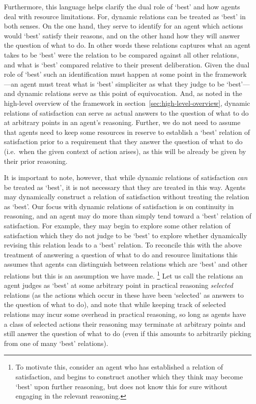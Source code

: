 \documentclass[10pt]{article}
\begin{document}
Furthermore, this language helps clarify the dual role of `best' and how agents deal with resource limitations.
For, dynamic relations can be treated as `best' in both senses.
On the one hand, they serve to identify for an agent which actions would `best' satisfy their reasons, and on the other hand how they will answer the question of what to do.
In other words these relations captures what an agent takes to be `best' were the relation to be compared against all other relations, and what is `best' compared relative to their present deliberation.
Given the dual role of `best' such an identification must happen at some point in the framework---an agent must treat what is `best' simpliciter as what they judge to be `best'---and dynamic relations serve as this point of equivocation.
And, as noted in the high-level overview of the framework in section~\ref{sec:high-level-overview}, dynamic relations of satisfaction can serve as actual answers to the question of what to do at arbitrary points in an agent's reasoning.
Further, we do not need to assume that agents need to keep some resources in reserve to establish a `best' relation of satisfaction prior to a requirement that they answer the question of what to do (i.e.\ when the given context of action arises), as this will be already be given by their prior reasoning.

It is important to note, however, that while dynamic relations of satisfaction \emph{can} be treated as `best', it is not necessary that they are treated in this way.
Agents may dynamically construct a relation of satisfaction without treating the relation as `best'.
Our focus with dynamic relations of satisfaction is on continuity in reasoning, and an agent may do more than simply tend toward a `best' relation of satisfaction.
For example, they may begin to explore some other relation of satisfaction which they do not judge to be `best' to explore whether dynamically revising this relation leads to a `best' relation.
To reconcile this with the above treatment of answering a question of what to do and resource limitations this assumes that agents can distinguish between relations which are `best' and other relations but this is an assumption we have made.\nolinebreak
\footnote{To motivate this, consider an agent who has established a relation of satisfaction, and begins to construct another which they think may become `best' upon further reasoning, but does not know this for sure without engaging in the relevant reasoning.}
Let us call the relations an agent judges as `best' at some arbitrary point in practical reasoning \emph{selected} relations (as the actions which occur in these have been `selected' as answers to the question of what to do), and note that while keeping track of selected relations may incur some overhead in practical reasoning, so long as agents have a class of selected actions their reasoning may terminate at arbitrary points and still answer the question of what to do (even if this amounts to arbitrarily picking from one of many `best' relations).
\end{document}
